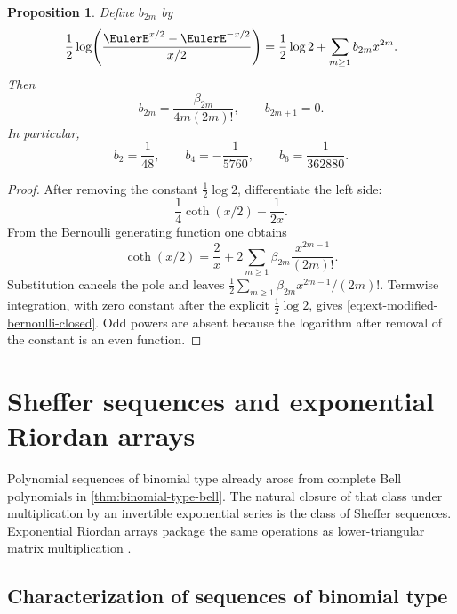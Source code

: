 \documentclass[11pt,a4paper,oneside,openany]{book}
\newtheorem{proposition}[theorem]{Proposition}
\theoremstyle{definition}
\theoremstyle{remark}
\begin{document}
\begin{proposition}
Define \(b_{2m}\) by
\begin{equation}\label{eq:ext-modified-bernoulli-egf}
 \frac12\log\!\left(\frac{\EulerE^{x/2}-\EulerE^{-x/2}}{x/2}\right)
 =\frac12\log2+\sum_{m\ge1}b_{2m}x^{2m}.
\end{equation}
Then
\begin{equation}\label{eq:ext-modified-bernoulli-closed}
 b_{2m}=\frac{\beta_{2m}}{4m(2m)!},\qquad b_{2m+1}=0.
\end{equation}
In particular,
\[
 b_2=\frac1{48},\qquad b_4=-\frac1{5760},\qquad
 b_6=\frac1{362880}.
\]
\end{proposition}
\begin{proof}
After removing the constant \(\tfrac12\log2\), differentiate the left side:
\[
 \frac14\coth(x/2)-\frac1{2x}.
\]
From the Bernoulli generating function one obtains
\[
 \coth(x/2)=\frac2x+2\sum_{m\ge1}\beta_{2m}
 \frac{x^{2m-1}}{(2m)!}.
\]
Substitution cancels the pole and leaves
\(\tfrac12\sum_{m\ge1}\beta_{2m}x^{2m-1}/(2m)!\).
Termwise integration, with zero constant after the explicit
\(\tfrac12\log2\), gives \eqref{eq:ext-modified-bernoulli-closed}.  Odd powers
are absent because the logarithm after removal of the constant is an even
function.
\end{proof}

\chapter{Sheffer sequences and exponential Riordan arrays}
\label{ch:ext-sheffer}

Polynomial sequences of binomial type already arose from complete Bell
polynomials in \cref{thm:binomial-type-bell}.  The natural closure of that
class under multiplication by an invertible exponential series is the class of
Sheffer sequences.  Exponential Riordan arrays package the same operations as
lower-triangular matrix multiplication \cite{Roman1984}.

\section{Characterization of sequences of binomial type}
\end{document}
